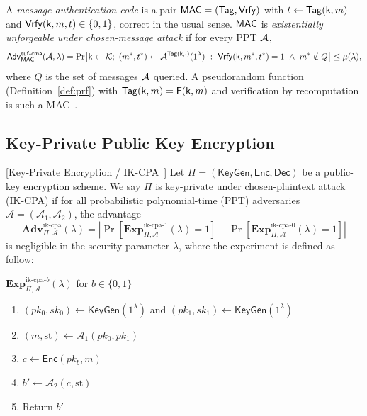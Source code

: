 \begin{definition}
\label{def:mac}
A \emph{message authentication code} is a pair $\mathsf{MAC} = (\mathsf{Tag}, \mathsf{Vrfy})$ with
$t \gets \mathsf{Tag}(\mathsf{k}, m)$ and $\mathsf{Vrfy}(\mathsf{k}, m, t) \in \{0,1\}$, correct in the usual sense.
$\mathsf{MAC}$ is \emph{existentially unforgeable under chosen-message attack} if for every PPT $\mathcal{A}$,
\[
\mathsf{Adv}^{\mathsf{euf\text{-}cma}}_{\mathsf{MAC}}(\mathcal{A},\lambda) =
\Pr\bigl[\mathsf{k} \gets \mathcal{K};\ (m^*,t^*) \gets \mathcal{A}^{\mathsf{Tag}(\mathsf{k},\cdot)}(1^{\lambda})\ :\
\mathsf{Vrfy}(\mathsf{k},m^*,t^*) = 1 \ \wedge\ m^* \notin Q\bigr] \le \mu(\lambda),
\]
where $Q$ is the set of messages $\mathcal{A}$ queried. A pseudorandom function
(Definition~\ref{def:prf}) with $\mathsf{Tag}(\mathsf{k},m) = \mathsf{F}(\mathsf{k},m)$ and verification by
recomputation is such a MAC~\cite{KatzLindell}.
\end{definition}



\subsection{Key-Private Public Key Encryption}
\begin{definition}\label{def:keyprivate}[Key-Private Encryption / IK-CPA~\cite{ASIACRYPT:BelBolDes01}]
Let $\Pi = (\mathsf{KeyGen}, \mathsf{Enc}, \mathsf{Dec})$ be a public-key encryption scheme. We say $\Pi$ is key-private under chosen-plaintext attack (\textsf{IK-CPA}) if for all probabilistic polynomial-time (\textsf{PPT}) adversaries $\mathcal{A} = (\mathcal{A}_1, \mathcal{A}_2)$, the advantage
\[
\mathbf{Adv}_{\Pi, \mathcal{A}}^{\mathrm{ik\text{-}cpa}}(\lambda) = \left| \Pr\left[ \mathbf{Exp}_{\Pi, \mathcal{A}}^{\mathrm{ik\text{-}cpa}\text{-}1}(\lambda) = 1 \right] - \Pr\left[ \mathbf{Exp}_{\Pi, \mathcal{A}}^{\mathrm{ik\text{-}cpa}\text{-}0}(\lambda) = 1 \right] \right|
\]
is negligible in the security parameter $\lambda$, where the experiment is defined as follow:

\vspace{7pt}


\underline{$\mathbf{Exp}_{\Pi, \mathcal{A}}^{\mathrm{ik\text{-}cpa}\text{-}b}(\lambda)$ for $b \in \{0,1\}$}
\begin{enumerate}
    \item $(pk_0, sk_0) \gets \mathsf{KeyGen}(1^\lambda)$ and $(pk_1, sk_1) \gets \mathsf{KeyGen}(1^\lambda)$
    \item $(m, \mathrm{st}) \gets \mathcal{A}_1(pk_0, pk_1)$
    \item $c \gets \mathsf{Enc}(pk_b, m)$
    \item $b' \gets \mathcal{A}_2(c, \mathrm{st})$
    \item Return $b'$
\end{enumerate}
\end{definition}

